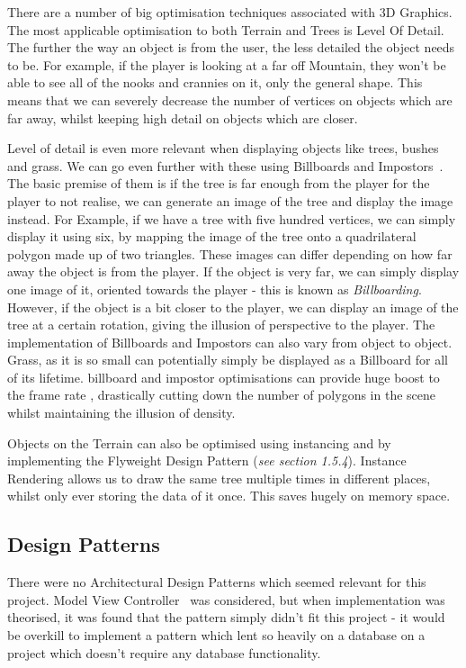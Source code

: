 \documentclass[a4paper,10pt]{report}
\begin{document}
There are a number of big optimisation techniques associated with 3D Graphics. The most applicable optimisation to both Terrain and Trees is Level Of Detail. The further the way an object is from the user, the less detailed the object needs to be. For example, if the player is looking at a far off Mountain, they won't be able to see all of the nooks and crannies on it, only the general shape. This means that we can severely decrease the number of vertices on objects which are far away, whilst keeping high detail on objects which are closer. \medskip

Level of detail is even more relevant when displaying objects like trees, bushes and grass. We can go even further with these using Billboards and Impostors~\cite{jia2013fast}. The basic premise of them is if the tree is far enough from the player for the player to not realise, we can generate an image of the tree and display the image instead. For Example, if we have a tree with five hundred vertices, we can simply display it using six, by mapping the image of the tree onto a quadrilateral polygon made up of two triangles. These images can differ depending on how far away the object is from the player. If the object is very far, we can simply display one image of it, oriented towards the player - this is known as \textit{Billboarding}. However, if the object is a bit closer to the player, we can display an image of the tree at a certain rotation, giving the illusion of perspective to the player. The implementation of Billboards and Impostors can also vary from object to object. Grass, as it is so small can potentially simply be displayed as a Billboard for all of its lifetime. billboard and impostor optimisations can provide huge boost to the frame rate , drastically cutting down the number of polygons in the scene whilst maintaining the illusion of density. \medskip

Objects on the Terrain can also be optimised using instancing and by implementing the Flyweight Design Pattern (\emph{see section 1.5.4}). Instance Rendering allows us to draw the same tree multiple times in different places, whilst only ever storing the data of it once. This saves hugely on memory space.  


\subsection{Design Patterns}

There were no Architectural Design Patterns which seemed relevant for this project. Model View Controller~\cite{vlissides1995design} was considered, but when implementation was theorised, it was found that the pattern simply didn't fit this project - it would be overkill to implement a pattern which lent so heavily on a database on a project which doesn't require any database functionality. \medskip
\end{document}
